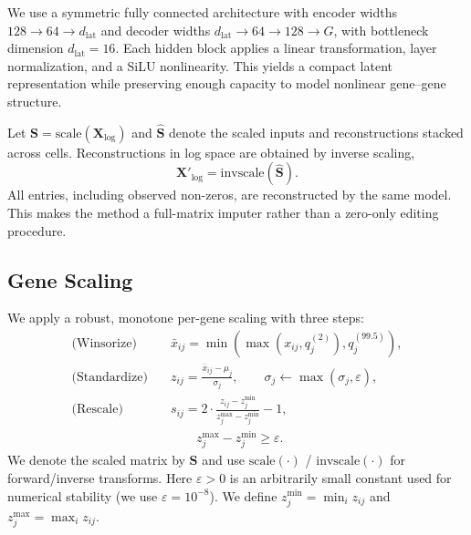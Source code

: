 \documentclass{article}
\theoremstyle{plain}
\theoremstyle{definition}
\theoremstyle{remark}
\begin{document}
  We use a symmetric fully connected architecture with encoder widths
  $128 \rightarrow 64 \rightarrow d_{\mathrm{lat}}$ and decoder widths
  $d_{\mathrm{lat}} \rightarrow 64 \rightarrow 128 \rightarrow G$, with bottleneck dimension
  $d_{\mathrm{lat}}{=}16$. Each hidden block applies a linear transformation, layer
  normalization, and a SiLU nonlinearity. This yields a compact latent
  representation while preserving enough capacity to model nonlinear
  gene--gene structure.

  Let $\mathbf{S}=\mathrm{scale}(\mathbf{X}_{\log})$ and $\hat{\mathbf{S}}$
  denote the scaled inputs and reconstructions stacked across cells.
  Reconstructions in log space are obtained by inverse scaling,
  \[
  \mathbf{X}'_{\log}=\mathrm{invscale}(\hat{\mathbf{S}}).
  \]
  All entries, including observed non-zeros, are reconstructed by the same model.
  This makes the method a full-matrix imputer rather than a zero-only editing
  procedure.

\subsection{Gene Scaling}
\label{sec:scaling}
We apply a robust, monotone per-gene scaling with three steps:
\[
\begin{aligned}
\text{(Winsorize)}\quad &\bar{x}_{ij}=\min(\max(x_{ij},q^{(2)}_j),q^{(99.5)}_j),\\
\text{(Standardize)}\quad &z_{ij}=\frac{\bar{x}_{ij}-\mu_j}{\sigma_j},\qquad
\sigma_j\leftarrow\max(\sigma_j,\varepsilon),\\
\text{(Rescale)}\quad &s_{ij}=2\cdot\frac{z_{ij}-z^{\min}_j}{z^{\max}_j-z^{\min}_j}-1,\\
&\qquad z^{\max}_j-z^{\min}_j\ge\varepsilon.
\end{aligned}
\]
We denote the scaled matrix by $\mathbf{S}$ and use
$\mathrm{scale}(\cdot)$ / $\mathrm{invscale}(\cdot)$ for forward/inverse
transforms.
Here $\varepsilon>0$ is an arbitrarily small constant used for numerical
stability (we use $\varepsilon=10^{-8}$).
We define $z^{\min}_j=\min_i z_{ij}$ and $z^{\max}_j=\max_i z_{ij}$.
\end{document}
